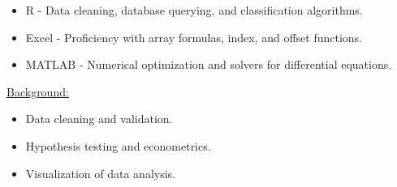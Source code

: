 \documentclass{res}
\begin{document}
\begin{resume}
\begin{minipage}{.5\textwidth}
		\begin{minipage}{1.25\textwidth} 
			\begin{itemize}
			\item R - Data cleaning, database querying, and classification algorithms.
			\item Excel - Proficiency with array formulas, index, and offset functions.
			\item MATLAB - Numerical optimization and solvers for differential equations.
		\end{itemize}
		\end{minipage}
\end{minipage}
\begin{minipage}{1.25\textwidth} 
\normalsize{\underline{ Background:}}

		\begin{minipage}{.2\textwidth} 
			\begin{itemize}
			\item Data cleaning and validation.
			\item Hypothesis testing and econometrics.
			\item Visualization of data analysis.
		\end{itemize}
		\end{minipage}

\end{minipage} \\

\vspace{-20 pt}
\\

\newcommand{\jobdesc}[5]{
\begin{minipage}{\textwidth}	
	\begin{minipage}{.2\textwidth}
\vspace{#5 pt}
	\textit{#1}\\
	#2 \\
	#3
	\end{minipage}
	\begin{minipage}{.75\textwidth}
	#4
	\end{minipage}
\end{minipage}
}

\vspace{-10 pt}


\end{resume}
\end{document}
